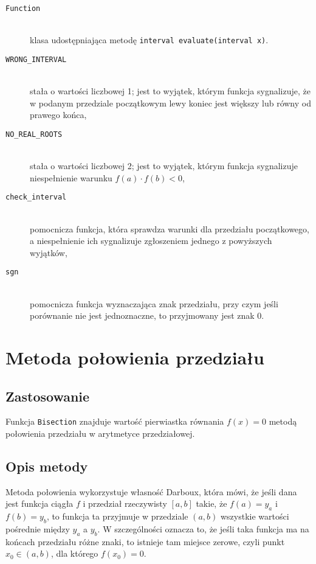 \documentclass[12pt]{article}
\begin{document}
			\begin{description}
				\item[\texttt{Function}] \hfill\\
					klasa udostępniająca metodę \texttt{interval evaluate(interval x)}.
				\item[\texttt{WRONG\_INTERVAL}] \hfill\\
					stała o wartości liczbowej 1; jest to wyjątek, którym funkcja sygnalizuje, że w podanym przedziale początkowym lewy koniec jest większy lub równy od prawego końca,
				\item[\texttt{NO\_REAL\_ROOTS}] \hfill\\
					stała o wartości liczbowej 2; jest to wyjątek, którym funkcja sygnalizuje niespełnienie warunku $f(a) \cdot f(b) < 0$,
				\item[\texttt{check\_interval}] \hfill\\
					pomocnicza funkcja, która sprawdza warunki dla przedziału początkowego, a niespełnienie ich sygnalizuje zgłoszeniem jednego z powyższych wyjątków,
        \item[\texttt{sgn}] \hfill\\
					pomocnicza funkcja wyznaczająca znak przedziału, przy czym jeśli porównanie nie jest jednoznaczne, to przyjmowany jest znak 0.
			\end{description}


	\section{Metoda połowienia przedziału}
		\subsection{Zastosowanie}
			Funkcja \texttt{Bisection} znajduje wartość pierwiastka równania
			$f(x) = 0$ metodą połowienia przedziału w arytmetyce przedziałowej.

		\subsection{Opis metody}
			Metoda połowienia wykorzystuje własność Darboux, która mówi,
			że jeśli dana jest funkcja ciągła $f$ i przedział rzeczywisty $[a, b]$ takie,
			że $f(a) = y_a$ i $f(b) = y_b$, to funkcja ta przyjmuje w przedziale $(a, b)$
			wszystkie wartości pośrednie między $y_a$ a $y_b$.
			W szczególności oznacza to, że jeśli taka funkcja ma
			na końcach przedziału różne znaki, to istnieje tam miejsce zerowe,
			czyli punkt $x_0 \in (a, b)$, dla którego $f(x_0) = 0$.
\end{document}
